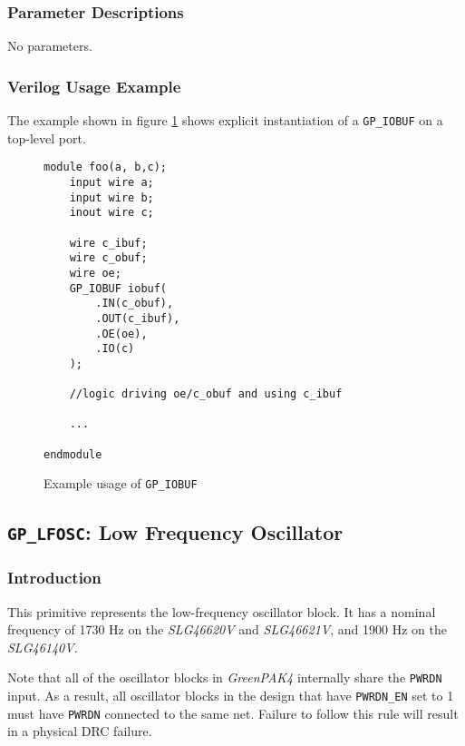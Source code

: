 \documentclass[11pt]{article}
\newcommand{\namestyle}[1]{\textit{#1}}
\newcommand{\tokenstyle}[1]{\texttt{#1}}
\begin{document}
\subsubsection{Parameter Descriptions}

No parameters.

\subsubsection{Verilog Usage Example}

The example shown in figure \ref{gp-iobuf-example} shows explicit instantiation of a \tokenstyle{GP\_IOBUF} on a top-level port.

\begin{figure}[h]
\begin{lstlisting}
module foo(a, b,c);
	input wire a;
	input wire b;
	inout wire c;

	wire c_ibuf;
	wire c_obuf;
	wire oe;
	GP_IOBUF iobuf(
		.IN(c_obuf),
		.OUT(c_ibuf),
		.OE(oe),
		.IO(c)
	);

	//logic driving oe/c_obuf and using c_ibuf

	...

endmodule
\end{lstlisting}
\caption{Example usage of \tokenstyle{GP\_IOBUF}}
\label{gp-iobuf-example}
\end{figure}


\pagebreak
\subsection{\tokenstyle{GP\_LFOSC}: Low Frequency Oscillator}
\label{gp-lfosc}

\subsubsection{Introduction}
This primitive represents the low-frequency oscillator block. It has a nominal frequency of 1730 Hz on the
\namestyle{SLG46620V} and \namestyle{SLG46621V}, and 1900 Hz on the \namestyle{SLG46140V}.

Note that all of the oscillator blocks in \namestyle{GreenPAK4} internally share the \tokenstyle{PWRDN} input. As a result, all oscillator
blocks in the design that have \tokenstyle{PWRDN\_EN} set to 1 must have \tokenstyle{PWRDN} connected to the same net. Failure to follow this
rule will result in a physical DRC failure.
\end{document}
